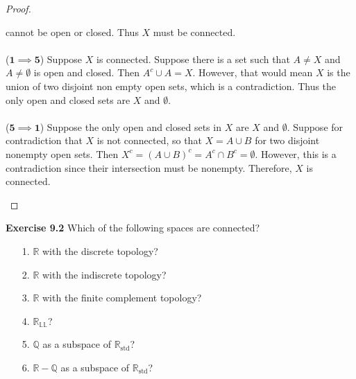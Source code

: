 \documentclass[a4paper,12pt,twoside]{hmcpset}
\begin{document}
\begin{proof}
\begin{enumerate}
        cannot be open or closed. Thus $X$ must be connected.
        \\
        \\
        ($\mathbf{1 \implies 5}$) Suppose $X$ is connected. Suppose
        there is a set such that $A \ne X$ and $A \ne \emptyset$ 
        is open and closed. Then $A^c
        \cup A = X$. However, that would mean $X$ is the union of two
        disjoint non empty open sets, which is a contradiction. Thus
        the only open and closed sets are $X$ and $\emptyset$.
        \\
        \\
        ($\mathbf{5 \implies 1}$) Suppose the only open and closed
        sets in $X$ are $X$ and $\emptyset.$ Suppose for contradiction
        that $X$ is not connected, so that $X = A \cup B$ for two
        disjoint nonempty open sets. Then $X^c = (A \cup B)^c = A^c
        \cap B^c = \emptyset$. However, this is a contradiction since
        their intersection must be nonempty. Therefore, $X$ is
        connected. 

        
    \end{enumerate}
\end{proof}

\begin{exercise}[Exercise 9.2]
\textbf{Exercise 9.2}
Which of the following spaces are connected?
\begin{enumerate}
    \item[1.] $\mathbb{R}$ with the discrete topology?
    \item[2.] $\mathbb{R}$ with the indiscrete topology?
    \item[3.] $\mathbb{R}$ with the finite complement topology?
    \item[4.] $\mathbb{R_\text{LL}}$?
    \item[5.] $\mathbb{Q}$ as a subspace of $\mathbb{R}_{\text{std}}$?
    \item[6.] $\mathbb{R} - \mathbb{Q}$ as a subspace of $\mathbb{R}_{\text{std}}$?      
\end{enumerate}
\end{exercise}
\end{document}
